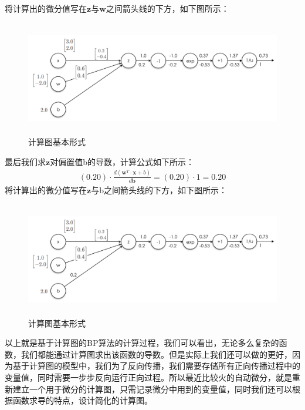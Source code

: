 \documentclass[UTF8]{article}
\begin{document}
将计算出的微分值写在$\boldsymbol{z}$与$\boldsymbol{w}$之间箭头线的下方，如下图所示：
\begin{figure}[H]
	\caption{计算图基本形式}
	\label{f000048}
	\centering
	\includegraphics[height=5cm]{images/f000048}
\end{figure}
最后我们求$\boldsymbol{z}$对偏置值b的导数，计算公式如下所示：
\begin{equation}
\begin{aligned}
(0.20) \cdot \frac{d(\boldsymbol{w}^T \cdot \boldsymbol{x}+b)}{d\boldsymbol{b}}=(0.20) \cdot 1=0.20
\end{aligned}
\label{mlp-sigmoid-cg-11}
\end{equation}
将计算出的微分值写在$\boldsymbol{z}$与b之间箭头线的下方，如下图所示：
\begin{figure}[H]
	\caption{计算图基本形式}
	\label{f000049}
	\centering
	\includegraphics[height=5cm]{images/f000049}
\end{figure}
以上就是基于计算图的BP算法的计算过程，我们可以看出，无论多么复杂的函数，我们都能通过计算图求出该函数的导数。但是实际上我们还可以做的更好，因为基于计算图的模型中，我们为了反向传播，我们需要存储所有正向传播过程中的变量值，同时需要一步步反向运行正向过程。所以最近比较火的自动微分，就是重新建立一个用于微分的计算图，只需记录微分中用到的变量值，同时我们还可以根据函数求导的特点，设计简化的计算图。
\end{document}

